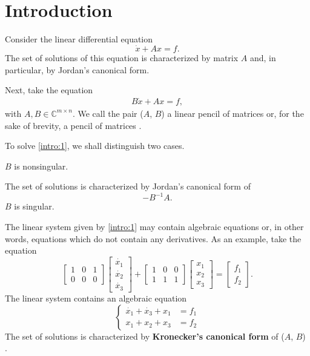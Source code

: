 \section{Introduction}
Consider the linear differential equation
\[
	\dot{x} + Ax = f.
\]
The set of solutions of this equation is characterized by matrix $A$ and, in particular, by Jordan's canonical form.

Next, take the equation
\begin{gather} \label{intro:1}
	B\dot{x} + Ax = f,
\end{gather}
with $A, B \in \mathbb{C}^{m \times n}$. We call the pair ($A$, $B$) a linear pencil of matrices or, for the sake of brevity,
a pencil of matrices \cite{ikramov}.

To solve \eqref{intro:1}, we shall distinguish two cases.
\begin{cs}
	\case $B$ is nonsingular.

		The set of solutions is characterized by Jordan's canonical form of \[-B^{-1}A.\]
	\case $B$ is singular.

		The linear system given by \eqref{intro:1} may contain algebraic equations or, in other words, equations which do
		not contain any derivatives. As an example, take the equation
		\[
			\begin{bmatrix}
				1 & 0 & 1 \\
				0 & 0 & 0
			\end{bmatrix}
			\begin{bmatrix}
				\dot{x_1} \\
				\dot{x_2} \\
				\dot{x_3}
			\end{bmatrix} + 
			\begin{bmatrix}
				1 & 0 & 0 \\
				1 & 1 & 1
			\end{bmatrix}
			\begin{bmatrix}
				x_1 \\
				x_2 \\
				x_3
			\end{bmatrix}
			= \begin{bmatrix}
				f_1 \\
				f_2
			\end{bmatrix}.
		\]
		The linear system contains an algebraic equation
		\begin{equation*}
			\left\{
				\begin{aligned}
					\dot{x_1} + \dot{x_3} + x_1 &= f_1 \\
					x_1 + x_2 + x_3 &= f_2
				\end{aligned}
			\right.
		\end{equation*}
		The set of solutions is characterized by \textbf{Kronecker's canonical form} of ($A$, $B$)
		\cite{gantmacher, kunkel-mehrmann}.
\end{cs}
\vspace{5mm}


